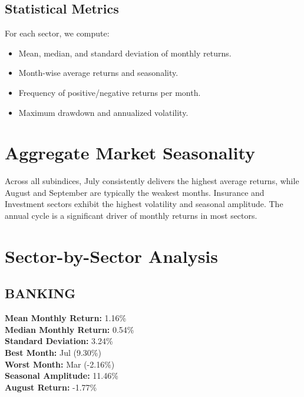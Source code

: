 \documentclass[12pt]{article}
\begin{document}
\subsection{Statistical Metrics}
For each sector, we compute:
\begin{itemize}
    \item Mean, median, and standard deviation of monthly returns.
    \item Month-wise average returns and seasonality.
    \item Frequency of positive/negative returns per month.
    \item Maximum drawdown and annualized volatility.
\end{itemize}
\section{Aggregate Market Seasonality}
Across all subindices, July consistently delivers the highest average returns, while August and September are typically the weakest months. Insurance and Investment sectors exhibit the highest volatility and seasonal amplitude. The annual cycle is a significant driver of monthly returns in most sectors.
\section{Sector-by-Sector Analysis}

\subsection{BANKING}
\textbf{Mean Monthly Return:} 1.16\% \\
\textbf{Median Monthly Return:} 0.54\% \\
\textbf{Standard Deviation:} 3.24\% \\
\textbf{Best Month:} Jul (9.30\%) \\
\textbf{Worst Month:} Mar (-2.16\%) \\
\textbf{Seasonal Amplitude:} 11.46\% \\
\textbf{August Return:} -1.77\% \\
\end{document}
